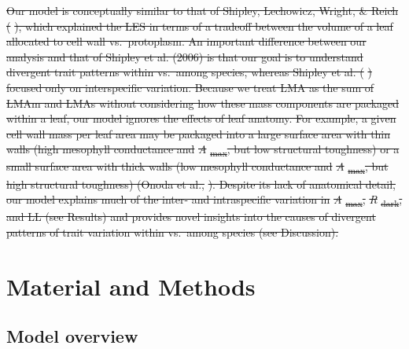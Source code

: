 \documentclass[12pt,]{article}
\theoremstyle{definition}
\theoremstyle{definition}
\theoremstyle{definition}
\theoremstyle{remark}
\providecommand{\DIFdeltex}[1]{{\protect\color{red}\sout{#1}}}                      %
\providecommand{\DIFdelbegin}{} %
\providecommand{\DIFdelend}{} %
\providecommand{\DIFdel}[1]{\texorpdfstring{\DIFdeltex{#1}}{}} %
\newcommand{\DIFscaledelfig}{0.5}
\newlength{\DIFdelgraphicswidth} %
\newlength{\DIFdelgraphicsheight} %
\newcommand{\DIFdelincludegraphics}[2][]{%
\sbox{\DIFdelgraphicsbox}{\DIFOincludegraphics[#1]{#2}}%
\settoboxwidth{\DIFdelgraphicswidth}{\DIFdelgraphicsbox} %
\settoboxtotalheight{\DIFdelgraphicsheight}{\DIFdelgraphicsbox} %
\scalebox{\DIFscaledelfig}{%
\parbox[b]{\DIFdelgraphicswidth}{\usebox{\DIFdelgraphicsbox}\\[-\baselineskip] \rule{\DIFdelgraphicswidth}{0em}}\llap{\resizebox{\DIFdelgraphicswidth}{\DIFdelgraphicsheight}{%
\setlength{\unitlength}{\DIFdelgraphicswidth}%
\begin{picture}(1,1)%
\thicklines\linethickness{2pt} %
{\color[rgb]{1,0,0}\put(0,0){\framebox(1,1){}}}%
{\color[rgb]{1,0,0}\put(0,0){\line( 1,1){1}}}%
{\color[rgb]{1,0,0}\put(0,1){\line(1,-1){1}}}%
\end{picture}%
}\hspace*{3pt}}} %
} %
\DeclareRobustCommand{\DIFdelbegin}{\DIFOdelbegin \let\includegraphics\DIFdelincludegraphics} %
\DeclareRobustCommand{\DIFdelend}{\DIFOaddend \let\includegraphics\DIFOincludegraphics} %
\begin{document}
\begin{itemize}
\DIFdelbegin \DIFdel{Our model is conceptually similar to that of Shipley, Lechowicz, Wright,
\& Reich (}%
\DIFdel{), which explained
the LES in terms of a tradeoff between the volume of a leaf allocated to
cell wall vs.~protoplasm. An important difference between our analysis
and that of Shipley et al. (2006) is that our goal is to understand
divergent trait patterns within vs.~among species, whereas Shipley et
al. (}%
\DIFdel{) focused only on
interspecific variation. Because we treat LMA as the sum of LMAm and
LMAs without considering how these mass components are packaged within a
leaf, our model ignores the effects of leaf anatomy. For example, a
given cell wall mass per leaf area may be packaged into a large surface
area with thin walls (high mesophyll conductance and
}\emph{\DIFdel{A}}%
\DIFdel{\textsubscript{max}, but low structural toughness) or a small
surface area with thick walls (low mesophyll conductance and
}\emph{\DIFdel{A}}%
\DIFdel{\textsubscript{max}, but high structural toughness) (Onoda et
al., }%
\DIFdel{). Despite its lack of
anatomical detail, our model explains much of the inter- and
intraspecific variation in }\emph{\DIFdel{A}}%
\DIFdel{\textsubscript{max},
}\emph{\DIFdel{R}}%
\DIFdel{\textsubscript{dark}, and LL (see Results) and provides novel
insights into the causes of divergent patterns of trait variation within
vs.~among species (see Discussion).
}%

\DIFdelend \hypertarget{material-and-methods}{%
\section{Material and Methods}\label{material-and-methods}}

\hypertarget{model-overview}{%
\subsection{Model overview}\label{model-overview}}


\end{itemize}
\end{document}
